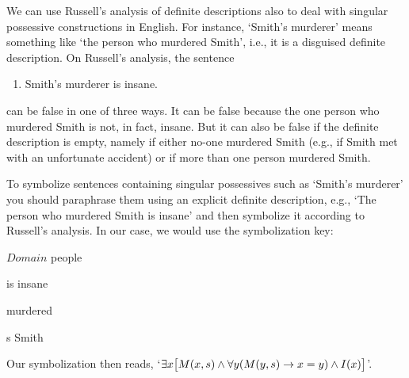We can use Russell's analysis of definite descriptions also to deal with singular possessive constructions in English.  For instance, `Smith's murderer' means something like `the person who murdered Smith', i.e., it is a disguised definite description.  On Russell's analysis, the sentence
\begin{enumerate}
	\item\label{smithsmurder} Smith's murderer is insane.
\end{enumerate}
can be false in one of three ways. It can be false because the one person who murdered Smith is not, in fact, insane. But it can also be false if the definite description is empty, namely if either no-one murdered Smith (e.g., if Smith met with an unfortunate accident) or if more than one person murdered Smith.

To symbolize sentences containing singular possessives such as `Smith's murderer' you should paraphrase them using an explicit definite description, e.g., `The person who murdered Smith is insane' and then symbolize it according to Russell's analysis. In our case, we would use the symbolization key:
\begin{ekey}
	\item[$Domain$] people
	\item[\atom{I}{x}]  is insane 
	\item[\atom{M}{x,y}]  murdered 
	\item[s] Smith 
\end{ekey}
Our symbolization then reads, `$\exists x\bigl[M(x,s) \wedge \forall y(M(y,s) \rightarrow x=y) \wedge I(x)\bigr]$'.

